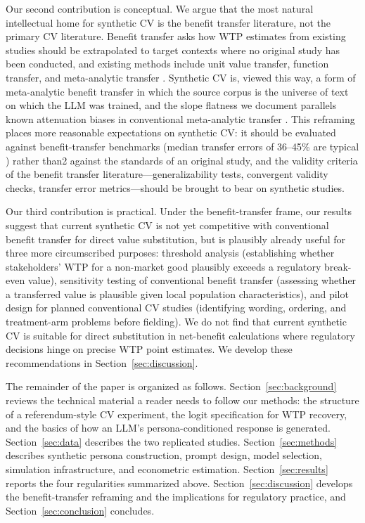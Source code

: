\documentclass[12pt]{article}
\begin{document}
Our second contribution is conceptual. We argue that the most natural
intellectual home for synthetic CV is the benefit transfer literature, not
the primary CV literature. Benefit transfer asks how WTP estimates from
existing studies should be extrapolated to target contexts where no original
study has been conducted, and existing methods include unit value transfer,
function transfer, and meta-analytic transfer
\parencite{Rosenberger2017, Loomis2015, Boyle2010}. Synthetic CV is, viewed
this way, a form of meta-analytic benefit transfer in which the source
corpus is the universe of text on which the LLM was trained, and the slope flatness we document parallels known attenuation biases in conventional meta-analytic transfer \parencite{Bergstrom2006}. This reframing places more
reasonable expectations on synthetic CV: it should be evaluated against
benefit-transfer benchmarks (median transfer errors of 36--45\% are
typical \parencite{Rosenberger2017}) rather than2 against the standards of an original study, and the
validity criteria of the benefit transfer literature---generalizability
tests, convergent validity checks, transfer error metrics---should be
brought to bear on synthetic studies.

Our third contribution is practical. Under the benefit-transfer frame, our
results suggest that current synthetic CV is not yet competitive with
conventional benefit transfer for direct value substitution, but is
plausibly already useful for three more circumscribed purposes: threshold
analysis (establishing whether stakeholders' WTP for a non-market good
plausibly exceeds a regulatory break-even value), sensitivity testing of
conventional benefit transfer (assessing whether a transferred value is
plausible given local population characteristics), and pilot design for
planned conventional CV studies (identifying wording, ordering, and
treatment-arm problems before fielding). We do not find that current
synthetic CV is suitable for direct substitution in net-benefit calculations
where regulatory decisions hinge on precise WTP point estimates. We develop
these recommendations in Section~\ref{sec:discussion}.

The remainder of the paper is organized as follows.
Section~\ref{sec:background} reviews the technical material a reader needs
to follow our methods: the structure of a referendum-style CV experiment,
the logit specification for WTP recovery, and the basics of how an LLM's
persona-conditioned response is generated. Section~\ref{sec:data} describes
the two replicated studies. Section~\ref{sec:methods} describes synthetic
persona construction, prompt design, model selection, simulation
infrastructure, and econometric estimation. Section~\ref{sec:results}
reports the four regularities summarized above. Section~\ref{sec:discussion}
develops the benefit-transfer reframing and the implications for regulatory
practice, and Section~\ref{sec:conclusion} concludes.
\end{document}

